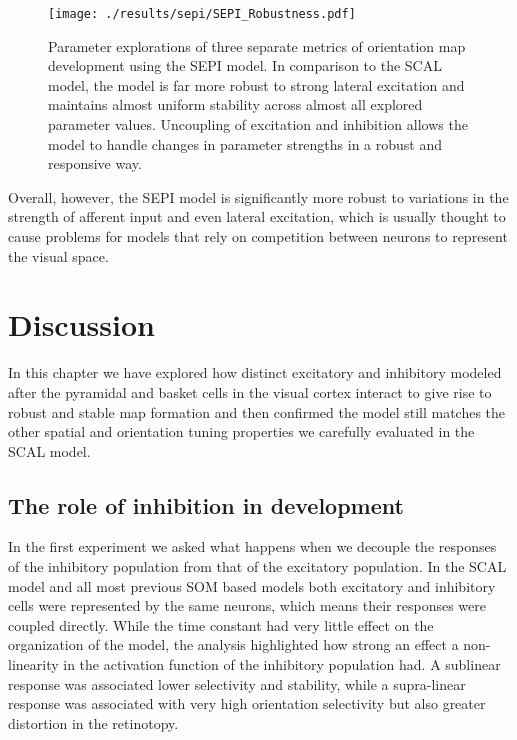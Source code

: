 \begin{figure}
	\centering
        \texttt{[image: ./results/sepi/SEPI\_Robustness.pdf]}
	\caption{Parameter explorations of three separate metrics of
          orientation map development using the SEPI model. In
          comparison to the SCAL model, the model is far more
          robust to strong lateral excitation and maintains almost
          uniform stability across almost all explored parameter
          values. Uncoupling of excitation and inhibition allows the
          model to handle changes in parameter strengths in a robust
          and responsive way.}
	\label{SEPIStability}
\end{figure}

Overall, however, the SEPI model is significantly more robust to
variations in the strength of afferent input and even lateral
excitation, which is usually thought to cause problems for models
that rely on competition between neurons to represent the visual
space.

\section{Discussion}

In this chapter we have explored how distinct excitatory and
inhibitory modeled after the pyramidal and basket cells in the visual
cortex interact to give rise to robust and stable map formation and
then confirmed the model still matches the other spatial and
orientation tuning properties we carefully evaluated in the SCAL
model.

\subsection{The role of inhibition in development}

In the first experiment we asked what happens when we decouple the
responses of the inhibitory population from that of the excitatory
population. In the SCAL model and all most previous SOM based models
both excitatory and inhibitory cells were represented by the same
neurons, which means their responses were coupled directly. While the
time constant had very little effect on the organization of the model,
the analysis highlighted how strong an effect a non-linearity in the
activation function of the inhibitory population had. A sublinear
response was associated lower selectivity and stability, while a
supra-linear response was associated with very high orientation
selectivity but also greater distortion in the retinotopy.

